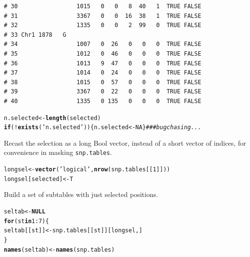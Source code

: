 \documentclass{article}\usepackage[]{graphicx}\usepackage[]{color}
\makeatletter
\newcommand{\hlnum}[1]{\textcolor[rgb]{0.686,0.059,0.569}{#1}}%
\newcommand{\hlstr}[1]{\textcolor[rgb]{0.192,0.494,0.8}{#1}}%
\newcommand{\hlcom}[1]{\textcolor[rgb]{0.678,0.584,0.686}{\textit{#1}}}%
\newcommand{\hlopt}[1]{\textcolor[rgb]{0,0,0}{#1}}%
\newcommand{\hlstd}[1]{\textcolor[rgb]{0.345,0.345,0.345}{#1}}%
\newcommand{\hlkwa}[1]{\textcolor[rgb]{0.161,0.373,0.58}{\textbf{#1}}}%
\newcommand{\hlkwb}[1]{\textcolor[rgb]{0.69,0.353,0.396}{#1}}%
\newcommand{\hlkwd}[1]{\textcolor[rgb]{0.737,0.353,0.396}{\textbf{#1}}}%
\newenvironment{kframe}{%
 \def\at@end@of@kframe{}%
 \ifinner\ifhmode%
  \def\at@end@of@kframe{\end{minipage}}%
  \begin{minipage}{\columnwidth}%
 \fi\fi%
 \def\FrameCommand##1{\hskip\@totalleftmargin \hskip-\fboxsep
 \colorbox{shadecolor}{##1}\hskip-\fboxsep
     \hskip-\linewidth \hskip-\@totalleftmargin \hskip\columnwidth}%
 \MakeFramed {\advance\hsize-\width
   \@totalleftmargin\z@ \linewidth\hsize
   \@setminipage}}%
 {\par\unskip\endMakeFramed%
 \at@end@of@kframe}
\newenvironment{knitrout}{}{} %
\makeatother
\begin{document}
\begin{knitrout}
\begin{kframe}
\begin{verbatim}
# 30                 1015   0   0   8  40   1  TRUE FALSE        
# 31                 3367   0   0  16  38   1  TRUE FALSE        
# 32                 1335   0   0   2  99   0  TRUE FALSE        
# 33 Chr1 1878   G                                               
# 34                 1007   0  26   0   0   0  TRUE FALSE        
# 35                 1012   0  46   0   0   0  TRUE FALSE        
# 36                 1013   9  47   0   0   0  TRUE FALSE        
# 37                 1014   0  24   0   0   0  TRUE FALSE        
# 38                 1015   0  57   0   0   0  TRUE FALSE        
# 39                 3367   0  22   0   0   0  TRUE FALSE        
# 40                 1335   0 135   0   0   0  TRUE FALSE
\end{verbatim}
\begin{alltt}
\hlstd{n.selected} \hlkwb{<-} \hlkwd{length}\hlstd{(selected)}
\hlkwa{if}\hlstd{(}\hlopt{!}\hlkwd{exists}\hlstd{(}\hlstr{'n.selected'}\hlstd{))\{n.selected} \hlkwb{<-} \hlnum{NA}\hlstd{\}} \hlcom{### bug chasing...}
\end{alltt}
\end{kframe}
\end{knitrout}

Recast the selection as a long Bool vector, instead of a short vector of indices, for convenience in masking \texttt{snp.tables}.

\begin{knitrout}\scriptsize
{}\color{fgcolor}\begin{kframe}
\begin{alltt}
\hlstd{longsel} \hlkwb{<-} \hlkwd{vector}\hlstd{(}\hlstr{'logical'}\hlstd{,}\hlkwd{nrow}\hlstd{(snp.tables[[}\hlnum{1}\hlstd{]]))}
\hlstd{longsel[selected]} \hlkwb{<-} \hlstd{T}
\end{alltt}
\end{kframe}
\end{knitrout}

Build a set of subtables with just selected positions.

\begin{knitrout}\footnotesize
{}\color{fgcolor}\begin{kframe}
\begin{alltt}
\hlstd{seltab} \hlkwb{<-}\hlkwa{NULL}
\hlkwa{for}\hlstd{(st} \hlkwa{in} \hlnum{1}\hlopt{:}\hlnum{7}\hlstd{)\{}
  \hlstd{seltab[[st]]} \hlkwb{<-} \hlstd{snp.tables[[st]][longsel,]}
\hlstd{\}}
\hlkwd{names}\hlstd{(seltab)} \hlkwb{<-} \hlkwd{names}\hlstd{(snp.tables)}
\end{alltt}
\end{kframe}
\end{knitrout}
\end{document}
